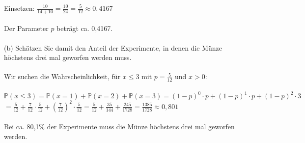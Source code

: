\documentclass[a4paper]{article}
\begin{document}
Einsetzen: \(\frac{10}{14+10}=\frac{10}{24}=\frac{5}{12}\approx 0,4167\)\\\\
Der Parameter $p$ beträgt ca. 0,4167.\\\\
(b) Schätzen Sie damit den Anteil der Experimente, in denen die Münze höchstens drei mal geworfen werden muss.\\\\
Wir suchen die Wahrscheinlichkeit, für $x\leq 3$ mit $p=\frac{5}{12}$ und $x>0$:\\\\
\(\mathbb{P}(x\leq 3)= \mathbb{P}(x=1)+\mathbb{P}(x=2)+\mathbb{P}(x=3)=(1-p)^0\cdot p + (1-p)^1\cdot p + (1-p)^2\cdot 3\)\\
\hspace*{1,45cm}\(=\frac{5}{12}+\frac{7}{12}\cdot \frac{5}{12} + \left(\frac{7}{12}\right)^2\cdot \frac{5}{12}= \frac{5}{12}+\frac{35}{144}+\frac{245}{1728}=\frac{1385}{1728}\approx 0,801\)\\\\
Bei ca. 80,1\% der Experimente muss die Münze höchstens drei mal geworfen werden.
\end{document}
